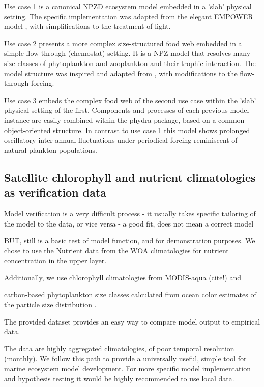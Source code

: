 \documentclass[journal abbreviations, manuscript]{copernicus}
\begin{document}
Use case 1 is a canonical NPZD ecosystem model embedded in a 'slab' physical setting. The specific implementation was adapted from the elegant EMPOWER model \citep{Anderson2015c}, with simplifications to the treatment of light.

Use case 2 presents a more complex size-structured food web embedded in a simple flow-through (chemostat) setting. It is a NPZ model that resolves many size-classes of phytoplankton and zooplankton and their trophic interaction. The model structure was inspired and adapted from \citet{Banas2011b}, with modifications to the flow-through forcing. 

Use case 3 embeds the complex food web of the second use case within the 'slab' physical setting of the first. Components and processes of each previous model instance are easily combined within the phydra package, based on a common object-oriented structure. In contrast to use case 1 this model shows prolonged oscillatory inter-annual fluctuations under periodical forcing reminiscent of natural plankton populations.


\subsection{Satellite chlorophyll and nutrient climatologies as verification data}
Model verification is a very difficult process
- it usually takes specific tailoring of the model to the data, or vice versa \citep{Schartau2017}
- a good fit, does not mean a correct model \citep{RykielJr1996}

BUT, still is a basic test of model function, and for demonstration purposes.
We chose to use the Nutrient data from the WOA climatologies for nutrient concentration in the upper layer.

Additionally, we use chlorophyll climatologies from MODIS-aqua (cite!) and 

carbon-based phytoplankton size classes calculated from ocean color estimates of the particle size distribution \cite{Kostadinov2016Carbon-basedDistribution}.

The provided dataset provides an easy way to compare model output to empirical data. 

The data are highly aggregated climatologies, of poor temporal resolution (monthly). We follow this path to provide a universally useful, simple tool for marine ecosystem model development. For more specific model implementation and hypothesis testing it would be highly recommended to use local data.
\end{document}
